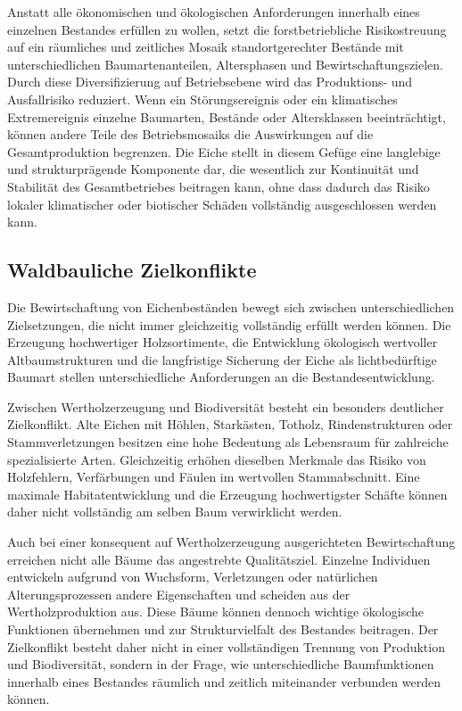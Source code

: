 \documentclass[twocolumn, bibliography=totoc, abstract=true]{scrartcl}
\begin{document}
Anstatt alle ökonomischen und ökologischen Anforderungen innerhalb eines einzelnen Bestandes erfüllen zu wollen, setzt die forstbetriebliche Risikostreuung auf ein räumliches und zeitliches Mosaik standortgerechter Bestände mit unterschiedlichen Baumartenanteilen, Altersphasen und Bewirtschaftungszielen. Durch diese Diversifizierung auf Betriebsebene wird das Produktions- und Ausfallrisiko reduziert. Wenn ein Störungsereignis oder ein klimatisches Extremereignis einzelne Baumarten, Bestände oder Altersklassen beeinträchtigt, können andere Teile des Betriebsmosaiks die Auswirkungen auf die Gesamtproduktion begrenzen. Die Eiche stellt in diesem Gefüge eine langlebige und strukturprägende Komponente dar, die wesentlich zur Kontinuität und Stabilität des Gesamtbetriebes beitragen kann, ohne dass dadurch das Risiko lokaler klimatischer oder biotischer Schäden vollständig ausgeschlossen werden kann.

\subsection{Waldbauliche Zielkonflikte}

Die Bewirtschaftung von Eichenbeständen bewegt sich zwischen unterschiedlichen Zielsetzungen, die nicht immer gleichzeitig vollständig erfüllt werden können. Die Erzeugung hochwertiger Holzsortimente, die Entwicklung ökologisch wertvoller Altbaumstrukturen und die langfristige Sicherung der Eiche als lichtbedürftige Baumart stellen unterschiedliche Anforderungen an die Bestandesentwicklung.

Zwischen Wertholzerzeugung und Biodiversität besteht ein besonders deutlicher Zielkonflikt. Alte Eichen mit Höhlen, Starkästen, Totholz, Rindenstrukturen oder Stammverletzungen besitzen eine hohe Bedeutung als Lebensraum für zahlreiche spezialisierte Arten. Gleichzeitig erhöhen dieselben Merkmale das Risiko von Holzfehlern, Verfärbungen und Fäulen im wertvollen Stammabschnitt. Eine maximale Habitatentwicklung und die Erzeugung hochwertigster Schäfte können daher nicht vollständig am selben Baum verwirklicht werden.

Auch bei einer konsequent auf Wertholzerzeugung ausgerichteten Bewirtschaftung erreichen nicht alle Bäume das angestrebte Qualitätsziel. Einzelne Individuen entwickeln aufgrund von Wuchsform, Verletzungen oder natürlichen Alterungsprozessen andere Eigenschaften und scheiden aus der Wertholzproduktion aus. Diese Bäume können dennoch wichtige ökologische Funktionen übernehmen und zur Strukturvielfalt des Bestandes beitragen. Der Zielkonflikt besteht daher nicht in einer vollständigen Trennung von Produktion und Biodiversität, sondern in der Frage, wie unterschiedliche Baumfunktionen innerhalb eines Bestandes räumlich und zeitlich miteinander verbunden werden können.
\end{document}
